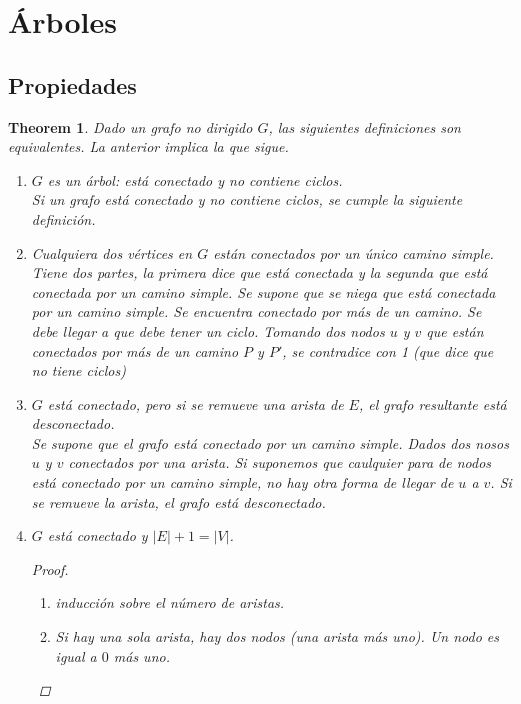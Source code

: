 \documentclass[12pt, fleqn]{article}
\newtheorem{theorem}{Theorem}[section]
\theoremstyle{definition}
\begin{document}
    \section{Árboles}
        \subsection{Propiedades}
            \begin{theorem}
                Dado un grafo no dirigido $G$, las siguientes definiciones son equivalentes. La anterior implica la que sigue.
                \begin{enumerate}
                    \item $G$ es un árbol: está conectado y no contiene ciclos.\\ 
                            \emph{Si un grafo está conectado y no contiene ciclos, se cumple la siguiente definición.}
                    \item Cualquiera dos vértices en $G$ están conectados por un único camino simple. \\ 
                            \emph{Tiene dos partes, la primera dice 
                            que está conectada y la segunda que está conectada por un camino simple. Se supone que se niega que está conectada por un camino simple.
                            Se encuentra conectado por más de un camino. Se debe llegar a que debe tener un ciclo. Tomando dos nodos $u$ y $v$ que están conectados
                            por más de un camino $P$ y $P'$, se contradice con 1 (que dice que no tiene ciclos)}
                    \item $G$ está conectado, pero si se remueve una arista de $E$, el grafo resultante está desconectado. 
                    \\ \emph{Se supone que el grafo está conectado
                        por un camino simple. Dados dos nosos $u$ y $v$ conectados por una arista. Si suponemos que caulquier para de nodos está conectado por un camino
                        simple, no hay otra forma de llegar de $u$ a $v$. Si se remueve la arista, el grafo está desconectado.}
                    \item $G$ está conectado y $|E| + 1 = |V| $. 
                        \begin{proof}
                            \begin{enumerate}
                                \item inducción sobre el número de aristas.
                                \item Si hay una sola arista, hay dos nodos (una arista más uno). Un nodo es igual a $0$ más uno.

\end{enumerate}
\end{proof}
\end{enumerate}
\end{theorem}
\end{document}
